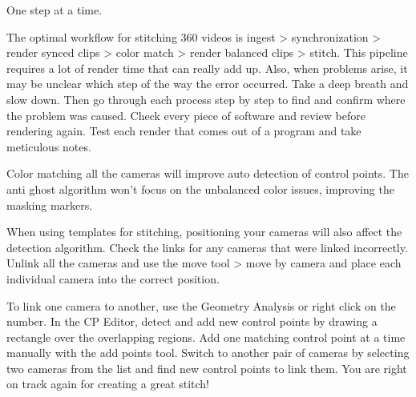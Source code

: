 \begin{fullwidth}

{\large One step at a time. \par}

The optimal workflow for stitching 360 videos is ingest > synchronization > render synced clips > color match > render balanced clips > stitch. This pipeline requires a lot of render time that can really add up. Also, when problems arise, it may be unclear which step of the way the error occurred. Take a deep breath and slow down. Then go through each process step by step to find and confirm where the problem was caused. Check every piece of software and review before rendering again. Test each render that comes out of a program and take meticulous notes. 

Color matching all the cameras will improve auto detection of control points. The anti ghost algorithm won’t focus on the unbalanced color issues, improving the masking markers. 


When using templates for stitching, positioning your cameras will also affect the detection algorithm. Check the links for any cameras that were linked incorrectly. Unlink all the cameras and use the move tool > move by camera and place each individual camera into the correct position.


\clearpage
To link one camera to another, use the Geometry Analysis  or right click on the number. In the CP Editor, detect and add new control points by drawing a rectangle over the overlapping regions. Add one matching control point at a time manually with the add points tool. Switch to another pair of cameras by selecting two cameras from the list and find new control points to link them. You are right on track again for creating a great stitch!



\clearpage
\end{fullwidth}